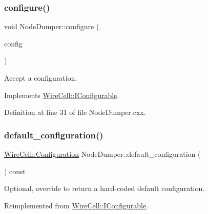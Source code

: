 \subsubsection{\texorpdfstring{configure()}{configure()}}
{\footnotesize\ttfamily void Node\+Dumper\+::configure (\begin{DoxyParamCaption}\item[{const \hyperlink{namespace_wire_cell_a9f705541fc1d46c608b3d32c182333ee}{Wire\+Cell\+::\+Configuration} \&}]{config }\end{DoxyParamCaption})\hspace{0.3cm}{\ttfamily [virtual]}}



Accept a configuration. 



Implements \hyperlink{class_wire_cell_1_1_i_configurable_a57ff687923a724093df3de59c6ff237d}{Wire\+Cell\+::\+I\+Configurable}.



Definition at line 31 of file Node\+Dumper.\+cxx.

\mbox{\label{class_wire_cell_apps_1_1_node_dumper_add7457528e1b13ef4bd3cb9331ee5911}} 
\subsubsection{\texorpdfstring{default\+\_\+configuration()}{default\_configuration()}}
{\footnotesize\ttfamily \hyperlink{namespace_wire_cell_a9f705541fc1d46c608b3d32c182333ee}{Wire\+Cell\+::\+Configuration} Node\+Dumper\+::default\+\_\+configuration (\begin{DoxyParamCaption}{ }\end{DoxyParamCaption}) const\hspace{0.3cm}{\ttfamily [virtual]}}



Optional, override to return a hard-\/coded default configuration. 



Reimplemented from \hyperlink{class_wire_cell_1_1_i_configurable_a54841b2da3d1ea02189478bff96f7998}{Wire\+Cell\+::\+I\+Configurable}.



